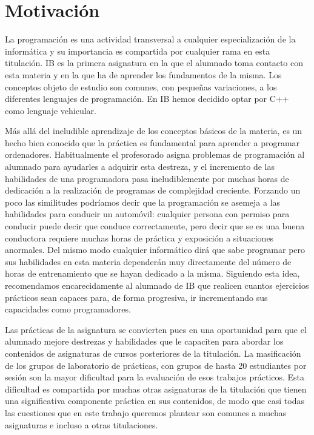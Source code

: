 \documentclass[twocolumn,twoside,a4paper, 10pt]{article}
\begin{document}

\section{Motivación}
La programación es una actividad transversal a cualquier especialización de la informática y su
importancia es compartida por cualquier rama en esta titulación.
IB es la primera asignatura en la que el alumnado toma contacto con esta materia y en la que ha de aprender
los fundamentos de la misma.
Los conceptos objeto de estudio son comunes, con pequeñas variaciones, a los diferentes lenguajes de programación.
En IB hemos decidido optar por C++ como lenguaje vehicular.

Más allá del ineludible aprendizaje de los conceptos básicos de la materia, 
es un hecho bien conocido que la práctica es fundamental para aprender a programar ordenadores. 
Habitualmente el profesorado asigna problemas de programación al alumnado para ayudarles a adquirir esta 
destreza, y el incremento de las habilidades de una programadora pasa ineludiblemente por muchas horas de dedicación 
a la realización de programas de complejidad creciente.
Forzando un poco las similitudes podríamos decir que la programación se asemeja a las habilidades para
conducir un automóvil: cualquier persona con permiso para conducir puede decir que conduce correctamente, pero
decir que se es una buena conductora requiere muchas horas de práctica y exposición a situaciones anormales.
Del mismo modo cualquier informático dirá que sabe programar pero sus habilidades en esta materia dependerán
muy directamente del número de horas de entrenamiento que se hayan dedicado a la misma.
Siguiendo esta idea, recomendamos encarecidamente al alumnado de IB que realicen cuantos ejercicios prácticos
sean capaces para, de forma progresiva, ir incrementando sus capacidades como programadores.

Las prácticas de la asignatura se convierten pues en una oportunidad para que el alumnado mejore destrezas y
habilidades que le capaciten para abordar los contenidos de asignaturas de cursos posteriores de la
titulación.
La masificación de los grupos de laboratorio de prácticas, con grupos de hasta 20 estudiantes por sesión son
la mayor dificultad para la evaluación de esos trabajos prácticos.
Esta dificultad es compartida por muchas otras asignaturas de la titulación que tienen una significativa
componente práctica en sus contenidos, de modo que casi todas las cuestiones que en este trabajo queremos
plantear son comunes a muchas asignaturas e incluso a otras titulaciones.
\end{document}
